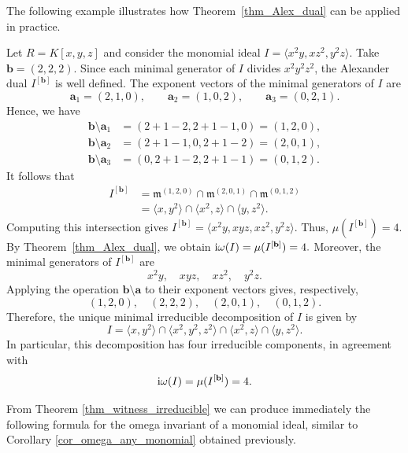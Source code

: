 \documentclass[11pt]{amsart}   %
\begin{document}
The following example illustrates how Theorem~\ref{thm_Alex_dual} can be applied in practice.
\begin{exm}
 Let $R=K[x,y,z]$ and consider the
monomial ideal
$I=\langle x^2y,xz^2,y^2z\rangle$.
Take $\mathbf{b}=(2,2,2)$. Since each minimal generator of $I$
divides $x^2y^2z^2$, the Alexander dual $I^{[\mathbf{b}]}$ is
well defined.
The exponent vectors of the minimal generators of $I$ are
\[
\mathbf{a}_1=(2,1,0),\qquad
\mathbf{a}_2=(1,0,2),\qquad
\mathbf{a}_3=(0,2,1).
\]
Hence, we have
\[
\begin{aligned}
\mathbf{b}\setminus\mathbf{a}_1
&=(2+1-2,2+1-1,0)=(1,2,0),\\
\mathbf{b}\setminus\mathbf{a}_2
&=(2+1-1,0,2+1-2)=(2,0,1),\\
\mathbf{b}\setminus\mathbf{a}_3
&=(0,2+1-2,2+1-1)=(0,1,2).
\end{aligned}
\]
It follows that
\[
\begin{aligned}
I^{[\mathbf{b}]}
&=\mathfrak{m}^{(1,2,0)}
  \cap\mathfrak{m}^{(2,0,1)}
  \cap\mathfrak{m}^{(0,1,2)}\\
&=\langle x,y^2\rangle\cap\langle x^2,z\rangle\cap\langle y,z^2\rangle.
\end{aligned}
\]
Computing this intersection gives
$I^{[\mathbf{b}]}
=\langle x^2y,xyz,xz^2,y^2z\rangle$. Thus,
$\mu(I^{[\mathbf{b}]})=4.$
By Theorem~\ref{thm_Alex_dual}, we obtain
${\rm i}\omega(I)=\mu(I^{[\mathbf{b}]})=4.$
Moreover, the minimal generators of $I^{[\mathbf{b}]}$ are
\[
x^2y,\quad xyz,\quad xz^2,\quad y^2z.
\]
Applying the operation $\mathbf{b}\setminus\mathbf{a}$ to their
exponent vectors gives, respectively,
\[
(1,2,0),\quad(2,2,2),\quad(2,0,1),\quad(0,1,2).
\]
Therefore, the unique minimal irreducible decomposition of $I$ is given by 
\[
I=\langle x,y^2\rangle
\cap\langle x^2,y^2,z^2\rangle
\cap\langle x^2,z\rangle
\cap\langle y,z^2\rangle.
\]
In particular, this decomposition has four irreducible components,
in agreement with
\[
{\rm i}\omega(I)=\mu(I^{[\mathbf{b}]} )=4.
\]
\end{exm}

From Theorem \ref{thm_witness_irreducible} we can produce immediately the following formula for the omega invariant of a monomial ideal, similar to Corollary \ref{cor_omega_any_monomial} obtained previously.
\end{document}
